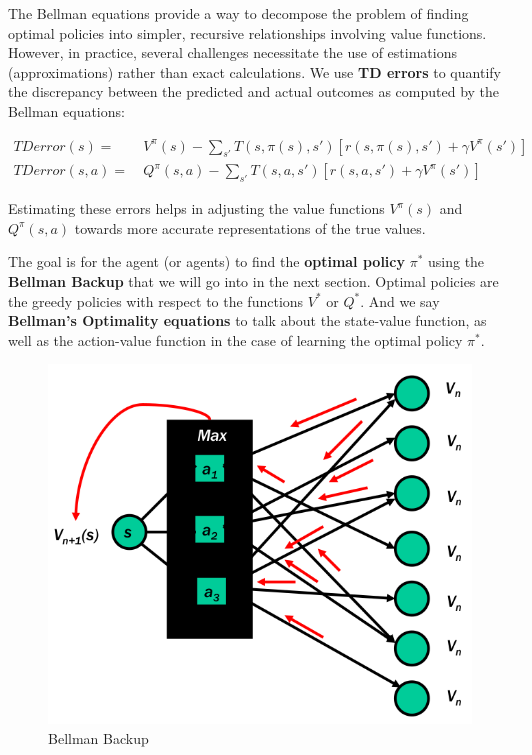 The Bellman equations provide a way to decompose the problem of finding optimal policies into simpler, recursive relationships involving value functions. However, in practice, several challenges necessitate the use of estimations (approximations) rather than exact calculations. We use \textbf{TD errors }to quantify the discrepancy between the predicted and actual outcomes as computed by the Bellman equations:

\begin{equation}
    \begin{aligned}
        TDerror(s) = & \ V^{\pi} (s) - \sum _{s'} T(s, \pi (s) , s') [ r(s, \pi (s) , s') + \gamma V^{\pi} (s')]
        \\
        TDerror(s,a) = & \ Q^{\pi} (s,a) - \sum _{s'} T(s, a , s') [ r(s, a , s') + \gamma V^{\pi} (s')]
    \end{aligned}
\end{equation}

Estimating these errors helps in adjusting the value functions \( V^{\pi}(s) \) and \( Q^{\pi}(s,a) \) towards more accurate representations of the true values.


The goal is for the agent (or agents) to find the \textbf{optimal policy} $\pi ^{*}$ using the \textbf{Bellman Backup} that we will go into in the next section. Optimal policies are the greedy policies with respect to the functions $V^{*}$ or $Q^{*}$. And we say \textbf{Bellman's Optimality equations} to talk about the state-value function, as well as the action-value function in the case of learning the optimal policy $\pi ^{*}$.
\begin{figure}[H]
    \centering
    \includegraphics[width=0.5\linewidth]{images_pfe/Screenshot from 2024-06-14 17-08-41.png}
    \caption{Bellman Backup}
    \label{fig:Bellman-Backup}
\end{figure}




